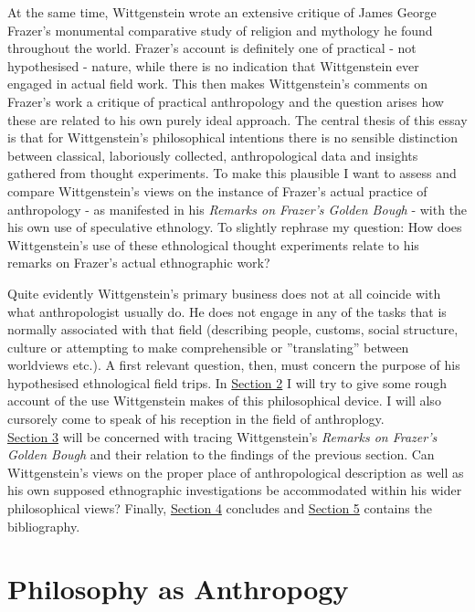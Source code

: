 \documentclass{article}
\begin{document}
At the same time, Wittgenstein wrote an extensive critique of James George Frazer's monumental comparative study of religion and mythology he found throughout the world. Frazer's account is definitely one of practical - not hypothesised - nature, while there is no indication that Wittgenstein ever engaged in actual field work. This then makes Wittgenstein's comments on Frazer's work a critique of practical anthropology and the question arises how these are related to his own purely ideal approach. The central thesis of this essay is that for Wittgenstein's philosophical intentions there is no sensible distinction between classical, laboriously collected, anthropological data and insights gathered from thought experiments. To make this plausible I want to assess and compare Wittgenstein's views on the instance of Frazer's actual practice of anthropology - as manifested in his \textit{Remarks on Frazer's Golden Bough} - with the his own use of speculative ethnology. To slightly rephrase my question: How does Wittgenstein’s use of these ethnological thought experiments relate to his remarks on Frazer’s actual ethnographic work?

Quite evidently Wittgenstein's primary business does not at all coincide with what anthropologist usually do. He does not engage in any of the tasks that is normally associated with that field (describing people, customs, social structure, culture or attempting to make comprehensible or ''translating'' between worldviews etc.). A first relevant question, then, must concern the purpose of his hypothesised ethnological field trips. In \hyperlink{sec2}{Section 2} I will try to give some rough account of the use Wittgenstein makes of this philosophical device. I will also cursorely come to speak of his reception in the field of anthroplogy. \\
\hyperlink{sec3}{Section 3} will be concerned with tracing Wittgenstein's \textit{Remarks on Frazer's Golden Bough} and their relation to the findings of the previous section. Can Wittgenstein’s views on the proper place of anthropological description as well as his own supposed ethnographic investigations be accommodated within his wider philosophical views? Finally, \hyperlink{sec4}{Section 4} concludes and \hyperlink{sec4}{Section 5} contains the bibliography.

\section{Philosophy as Anthropogy} %
\end{document}
